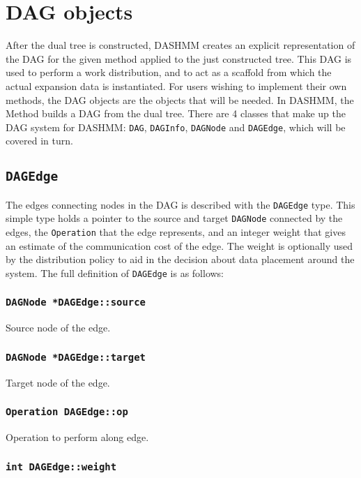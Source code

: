 \section{DAG objects}

After the dual tree is constructed, DASHMM creates an explicit representation
of the DAG for the given method applied to the just constructed tree. This DAG
is used to perform a work distribution, and to act as a scaffold from which
the actual expansion data is instantiated. For users wishing to implement
their own methods, the DAG objects are the objects that will be needed. In
DASHMM, the Method builds a DAG from the dual tree. There are 4 classes that
make up the DAG system for DASHMM: \texttt{DAG}, \texttt{DAGInfo},
\texttt{DAGNode} and \texttt{DAGEdge}, which will be covered in turn.

\subsection{\texttt{DAGEdge}}

The edges connecting nodes in the DAG is described with the \texttt{DAGEdge}
type. This simple type holds a pointer to the source and target
\texttt{DAGNode} connected by the edges, the \texttt{Operation} that the edge
represents, and an integer weight that gives an estimate of the communication
cost of the edge. The weight is optionally used by the distribution policy to
aid in the decision about data placement around the system. The full definition
of \texttt{DAGEdge} is as follows:

\subsubsection{\texttt{DAGNode *DAGEdge::source}}

Source node of the edge.

\subsubsection{\texttt{DAGNode *DAGEdge::target}}

Target node of the edge.

\subsubsection{\texttt{Operation DAGEdge::op}}

Operation to perform along edge.

\subsubsection{\texttt{int DAGEdge::weight}}

